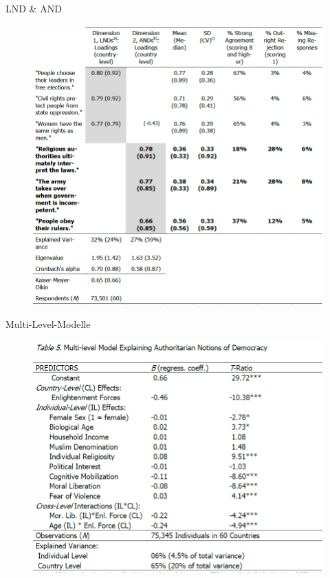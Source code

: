\documentclass[11pt]{beamer}
\begin{document}
\begin{frame}{LND \& AND}
	\begin{figure}[ht]
		\includegraphics[width=.8\textwidth]{pics/s11-2.png}
		\caption{\textbf{\cite[7]{Welzel2017}}}
		\label{Fig:XXX}
	\end{figure}
\end{frame}

\begin{frame}{Multi-Level-Modelle}
	\begin{figure}[ht]
		\includegraphics[width=.9\textwidth]{pics/s11-3.png}
		\caption{\textbf{\cite[22]{Welzel2017}}}
		\label{Fig:XXX}
	\end{figure}
\end{frame}
\end{document}
